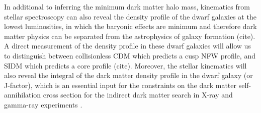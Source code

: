 In additional to inferring the minimum dark matter halo mass, kinematics from stellar spectroscopy can also reveal the density profile of the dwarf galaxies at the lowest luminosities, in which the baryonic effects are minimum and therefore dark matter physics can be separated from the astrophysics of galaxy formation (cite). A direct measurement of the density profile in these dwarf galaxies will allow us to distinguish between collisionless CDM  which predicts a cusp NFW profile, and SIDM which predicts a core profile (cite). Moreover, the stellar kinematics will also reveal the integral of the dark matter density profile in the dwarf galaxy (or J-factor), which is an essential input for the constraints on the dark matter self-annihilation cross section for the indirect dark matter search in X-ray and gamma-ray experiments \citep[e.g.][]{1108.3546}.


